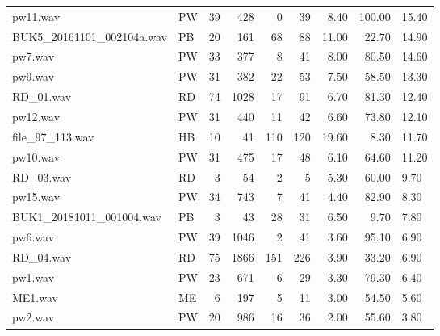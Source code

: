 \begin{table}
\begin{tabular}{llrrrrrrl}
pw11.wav                  &     PW &   39 &   428 &    0 &                  39 &       8.40 &  100.00 &           15.40 \\
BUK5_20161101_002104a.wav &     PB &   20 &   161 &   68 &                  88 &      11.00 &   22.70 &           14.90 \\
pw7.wav                   &     PW &   33 &   377 &    8 &                  41 &       8.00 &   80.50 &           14.60 \\
pw9.wav                   &     PW &   31 &   382 &   22 &                  53 &       7.50 &   58.50 &           13.30 \\
RD_01.wav                 &     RD &   74 &  1028 &   17 &                  91 &       6.70 &   81.30 &           12.40 \\
pw12.wav                  &     PW &   31 &   440 &   11 &                  42 &       6.60 &   73.80 &           12.10 \\
file_97_113.wav           &     HB &   10 &    41 &  110 &                 120 &      19.60 &    8.30 &           11.70 \\
pw10.wav                  &     PW &   31 &   475 &   17 &                  48 &       6.10 &   64.60 &           11.20 \\
RD_03.wav                 &     RD &    3 &    54 &    2 &                   5 &       5.30 &   60.00 &            9.70 \\
pw15.wav                  &     PW &   34 &   743 &    7 &                  41 &       4.40 &   82.90 &            8.30 \\
BUK1_20181011_001004.wav  &     PB &    3 &    43 &   28 &                  31 &       6.50 &    9.70 &            7.80 \\
pw6.wav                   &     PW &   39 &  1046 &    2 &                  41 &       3.60 &   95.10 &            6.90 \\
RD_04.wav                 &     RD &   75 &  1866 &  151 &                 226 &       3.90 &   33.20 &            6.90 \\
pw1.wav                   &     PW &   23 &   671 &    6 &                  29 &       3.30 &   79.30 &            6.40 \\
ME1.wav                   &     ME &    6 &   197 &    5 &                  11 &       3.00 &   54.50 &            5.60 \\
pw2.wav                   &     PW &   20 &   986 &   16 &                  36 &       2.00 &   55.60 &            3.80 \\

\end{tabular}
\end{table}

